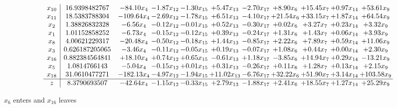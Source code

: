 \documentclass[9pt]{article}
\begin{document}
 \[\begin{array}{c| c c@{\hskip 2pt} c@{\hskip 2pt} c@{\hskip 2pt} c@{\hskip 2pt} c@{\hskip 2pt} c@{\hskip 2pt} c@{\hskip 2pt} c@{\hskip 2pt} c@{\hskip 2pt} }
 x_{10}   &  16.9398482767 & -84.10 x_{4} & -1.87 x_{12} & -1.30 x_{15} & +  5.47 x_{13} & -2.70 x_{17} & +  8.90 x_{6} & + 15.45 x_{7} & +  0.97 x_{14} & + 53.61 x_{9}\\
 x_{11}   &  18.5383788304 & -109.64 x_{4} & -2.69 x_{12} & -1.78 x_{15} & +  6.51 x_{13} & -4.10 x_{17} & + 21.54 x_{6} & + 33.15 x_{7} & +  1.87 x_{14} & + 64.54 x_{9}\\
 x_{2}   &  1.38826832328 & -6.56 x_{4} & -0.12 x_{12} & -0.01 x_{15} & +  0.52 x_{13} & -0.30 x_{17} & +  0.02 x_{6} & +  3.27 x_{7} & +  0.23 x_{14} & +  3.32 x_{9}\\
 x_{1}   &  1.01152858252 & -6.73 x_{4} & -0.15 x_{12} & -0.12 x_{15} & +  0.39 x_{13} & -0.24 x_{17} & +  1.31 x_{6} & +  1.43 x_{7} & +  0.06 x_{14} & +  3.93 x_{9}\\
 x_{8}   &  4.00621229317 & -20.48 x_{4} & -0.50 x_{12} & -0.18 x_{15} & +  1.44 x_{13} & -0.85 x_{17} & +  2.22 x_{6} & +  7.89 x_{7} & +  0.59 x_{14} & + 11.06 x_{9}\\
 x_{3}   &  0.626187205065 & -3.46 x_{4} & -0.11 x_{12} & -0.05 x_{15} & +  0.19 x_{13} & -0.07 x_{17} & +  1.08 x_{6} & +  0.44 x_{7} & +  0.00 x_{14} & +  2.30 x_{9}\\
 x_{16}   &  0.882384564841 & + 18.10 x_{4} & +  0.74 x_{12} & +  0.65 x_{15} & -0.61 x_{13} & +  1.18 x_{17} & -3.85 x_{6} & + 14.94 x_{7} & +  0.29 x_{14} & -13.21 x_{9}\\
 x_{5}   &  1.0814766143 & -5.04 x_{4} & -0.15 x_{12} & +  0.01 x_{15} & +  0.31 x_{13} & -0.26 x_{17} & +  0.11 x_{6} & +  1.28 x_{7} & +  0.13 x_{14} & +  2.15 x_{9}\\
 x_{18}   &  31.0610477271 & -182.13 x_{4} & -4.97 x_{12} & -1.94 x_{15} & + 11.02 x_{13} & -6.76 x_{17} & + 32.22 x_{6} & + 51.90 x_{7} & +  3.14 x_{14} & + 103.58 x_{9}\\
\hline
z    &  8.3790693507 & -42.64 x_{4} & -1.15 x_{12} & -0.33 x_{15} & +  2.79 x_{13} & -1.88 x_{17} & +  2.41 x_{6} & + 18.55 x_{7} & +  1.27 x_{14} & + 25.29 x_{9}\\
\end{array}\]


 $ x_{6} $ enters and $ x_{16} $ leaves 
\end{document}
